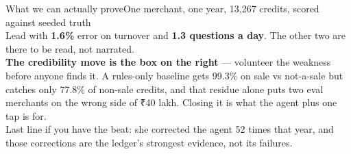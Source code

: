 \documentclass[aspectratio=169,10pt]{beamer}
\begin{document}
\begin{frame}{What we can actually prove}{One merchant, one year, 13,267 credits, scored against seeded truth}
{\\[0.4em]
Lead with \textbf{1.6\%} error on turnover and \textbf{1.3 questions a day}. The
other two are there to be read, not narrated.
\\[0.4em]
\textbf{The credibility move is the box on the right} --- volunteer the weakness
before anyone finds it. A rules-only baseline gets 99.3\% on sale vs not-a-sale
but catches only 77.8\% of non-sale credits, and that residue alone puts two eval
merchants on the wrong side of ₹40 lakh. Closing it is what the agent plus one tap is for.
\\[0.4em]
Last line if you have the beat: she corrected the agent 52 times that year, and
those corrections are the ledger's strongest evidence, not its failures.}
\end{frame}

\end{document}
